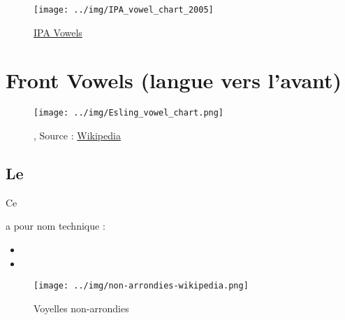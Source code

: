 \begin{center}
  \begin{figure}[h]
    \centering
    \texttt{[image: ../img/IPA\_vowel\_chart\_2005]}
    \caption{\href{https://en.wikipedia.org/wiki/Vowel\#Audio_samples}{IPA Vowels}}
    \label{fig:ipa-vowels}
  \end{figure}
\end{center}

\chapter{Front Vowels (langue vers l'avant)}\label{chap:frontvow}


\begin{center}
  \begin{figure}[h]
    \centering
    \texttt{[image: ../img/Esling\_vowel\_chart.png]}
    \caption[]{, Source : \href{https://en.wikipedia.org/w/index.php?curid=46937434}{Wikipedia}}
    \label{fig:front-vowels}
  \end{figure}
\end{center}


\newpage
\minitoc
\newpage



\section{Le \son {}}\label{sec:ilong}

\hypertarget{ilong}{Ce \son} a pour nom technique :

\begin{itemize}
\item {}
\item {}
\end{itemize}

\begin{center}
  \begin{figure}[h]
    \centering
    \texttt{[image: ../img/non-arrondies-wikipedia.png]}
    \caption{Voyelles non-arrondies}
    \label{fig:voy-ferm}
  \end{figure}
\end{center}

